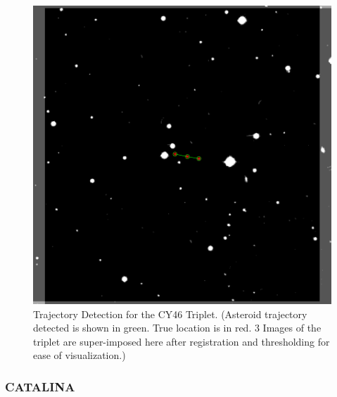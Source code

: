 \begin{figure}[t]
  \includegraphics[width=\linewidth]{Figures/NEATLines_LogicalImg.pdf}
\endminipage\hfill
\caption{Trajectory Detection for the CY46 Triplet. (Asteroid trajectory detected is shown in green. True location is in red. 3 Images of the triplet are super-imposed here after registration and thresholding for ease of visualization.)}
\label{fig:NEAT}
\end{figure}
\subsubsection{CATALINA}


